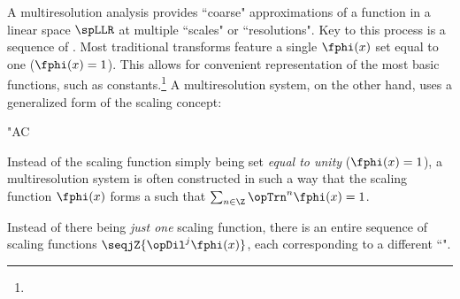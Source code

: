 A multiresolution analysis provides ``coarse" approximations of a function in a linear space $\spLLR$ at multiple
``scales" or ``resolutions".
Key to this process is a sequence of .
Most traditional transforms feature a single  $\fphi(x)$
set equal to one ($\fphi(x)=1$).
This allows for convenient representation of the most basic functions, such as constants.\footnote{}
A multiresolution system, on the other hand, uses a generalized form of the scaling concept:
\begin{dingautolist}{"AC}
  \item Instead of the scaling function simply being set \emph{equal to unity} ($\fphi(x)=1$),
        a multiresolution system  is often constructed in such a way that the scaling function 
        $\fphi(x)$ forms a   such that
        $\sum_{n\in\Z} \opTrn^n\fphi(x) = 1$.
  \item Instead of there being \emph{just one} scaling function, there
        is an entire sequence of scaling functions $\seqjZ{\opDil^j\fphi(x)}$, 
        each corresponding to a different ``".
\end{dingautolist}

